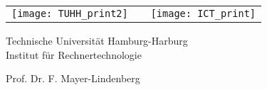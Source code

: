 \begin{titlepage}

\begin{tabular}{lcr}
\texttt{[image: TUHH\_print2]} & \hspace{1cm} & 
\texttt{[image: ICT\_print]}
\end{tabular}
\vfill%
\begin{center}%
\Large%
Technische Universität Hamburg-Harburg\\
Institut für Rechnertechnologie\par
Prof. Dr. F. Mayer-Lindenberg\par
\vspace{3cm}
\vfill%
{\huge \bf \thetitle \par %
\vspace{1.2cm}
\vfill
\Large
\thecategory\\ %
\vspace{0mm}
\theauthor \par %
\vspace{6mm}
\vfill
}
\Large
\thedate\par%
\vspace{0.5cm}
\normalsize
\end{center}
\end{titlepage}
